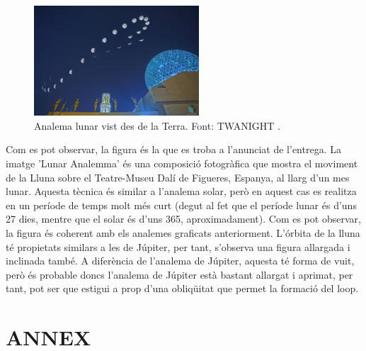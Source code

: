 \documentclass[a4paper, 11pt]{article}
\begin{document}
\begin{figure}[h!]
    \centering
    \includegraphics[width=0.55\textwidth]{images/analema_luna.jpg}
    \caption{Analema lunar vist des de la Terra. Font: TWANIGHT \cite{ANALEMA_MOON}.}
    \label{fig:analema_luna}
\end{figure}

\vspace{2mm}

\noindent Com es pot observar, la figura és la que es troba a l'anunciat de l'entrega. La imatge 'Lunar Analemma' és una composició fotogràfica que mostra el moviment de la Lluna sobre el Teatre-Museu Dalí de Figueres, Espanya, al llarg d'un mes lunar. Aquesta tècnica és similar a l'analema solar, però en aquest cas es realitza en un període de temps molt més curt (degut al fet que el període lunar és d'uns 27 dies, mentre que el solar és d'uns 365, aproximadament). Com es pot observar, la figura és coherent amb els analemes graficats anteriorment. L'órbita de la lluna té propietats similars a les de Júpiter, per tant, s'observa una figura allargada i inclinada també. A diferència de l'analema de Júpiter, aquesta té forma de vuit, però és probable doncs l'analema de Júpiter està bastant allargat i aprimat, per tant, pot ser que estigui a prop d'una obliqüitat que permet la formació del loop.




\newpage
\section*{ANNEX}



\newpage
\printbibliography
\end{document}

